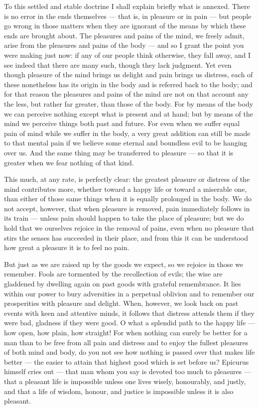  To this settled and stable doctrine I shall explain briefly what is annexed. There is no error in the ends themselves — that is, in pleasure or in pain — but people go wrong in those matters when they are ignorant of the means by which these ends are brought about. The pleasures and pains of the mind, we freely admit, arise from the pleasures and pains of the body — and so I grant the point you were making just now: if any of our people think otherwise, they fall away, and I see indeed that there are many such, though they lack judgment. Yet even though pleasure of the mind brings us delight and pain brings us distress, each of these nonetheless has its origin in the body and is referred back to the body; and for that reason the pleasures and pains of the mind are not on that account any the less, but rather far greater, than those of the body. For by means of the body we can perceive nothing except what is present and at hand; but by means of the mind we perceive things both past and future. For even when we suffer equal pain of mind while we suffer in the body, a very great addition can still be made to that mental pain if we believe some eternal and boundless evil to be hanging over us. And the same thing may be transferred to pleasure — so that it is greater when we fear nothing of that kind.

 This much, at any rate, is perfectly clear: the greatest pleasure or distress of the mind contributes more, whether toward a happy life or toward a miserable one, than either of those same things when it is equally prolonged in the body. We do not accept, however, that when pleasure is removed, pain immediately follows in its train — unless pain should happen to take the place of pleasure; but we do hold that we ourselves rejoice in the removal of pains, even when no pleasure that stirs the senses has succeeded in their place, and from this it can be understood how great a pleasure it is to feel no pain.

 But just as we are raised up by the goods we expect, so we rejoice in those we remember. Fools are tormented by the recollection of evils; the wise are gladdened by dwelling again on past goods with grateful remembrance. It lies within our power to bury adversities in a perpetual oblivion and to remember our prosperities with pleasure and delight. When, however, we look back on past events with keen and attentive minds, it follows that distress attends them if they were bad, gladness if they were good. O what a splendid path to the happy life — how open, how plain, how straight! For when nothing can surely be better for a man than to be free from all pain and distress and to enjoy the fullest pleasures of both mind and body, do you not see how nothing is passed over that makes life better — the easier to attain that highest good which is set before us? Epicurus himself cries out — that man whom you say is devoted too much to pleasures — that a pleasant life is impossible unless one lives wisely, honourably, and justly, and that a life of wisdom, honour, and justice is impossible unless it is also pleasant.

